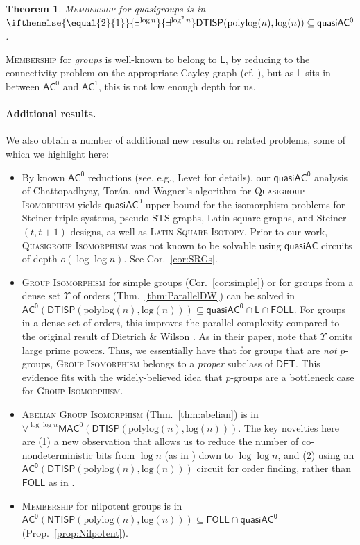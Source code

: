 \documentclass{article}
\newtheorem{theorem}{Theorem}\newtheorem{lemma}[theorem]{Lemma}\newtheorem{proposition}[theorem]{Proposition}\newtheorem{corollary}[theorem]{Corollary}\newtheorem{definition}[theorem]{Definition}\newtheorem{claim}[theorem]{Claim}\newtheorem{remark}[theorem]{Remark}\newtheorem{observation}[theorem]{Observation}\newtheorem{conjecture}[theorem]{Conjecture}\newtheorem{example}[theorem]{Example}
\newcommand{\algprobm}[1]{\textsc{#1}\xspace}
\newcommand{\betacc}[1]{\ifthenelse{\equal{#1}{1}}{\exists^{\log n}}{\exists^{\log^{#1}n}}} %
\newcommand*{\ComplexityClass}[1]{\ensuremath{\mathsf{#1}}\xspace}
\newcommand{\NTISP}{\ComplexityClass{NTISP}}
\newcommand{\DTISP}{\ComplexityClass{DTISP}}
\newcommand{\NTISPpll}{\ensuremath{\NTISP(\mathrm{polylog}(n),\mathrm{log}(n))}\xspace}
\newcommand{\DTISPpll}{\ensuremath{\DTISP(\mathrm{polylog}(n),\mathrm{log}(n))}\xspace}
\newcommand*{\LogSpace}{\ComplexityClass{L}}
\newcommand{\AC}{\ComplexityClass{AC}}
\newcommand{\ACz}{\ComplexityClass{AC^0}}
\newcommand{\qACz}{\ComplexityClass{quasiAC^0}}
\newcommand{\FOLL}{\ComplexityClass{FOLL}}
\begin{document}
\begin{theorem} \label{thm:main-cqm}
\algprobm{Membership} for quasigroups is in $\betacc{2}\DTISPpll \subseteq \qACz$.
\end{theorem}

 \algprobm{Membership} for \emph{groups} is well-known to belong to $\LogSpace$, by reducing to the connectivity problem on the appropriate Cayley graph (cf. \cite{BarringtonMcKenzie, Reingold}), but as $\LogSpace$ sits in between $\ACz$ and $\AC^1$, this is not low enough depth for us.

\paragraph{Additional results.} We also obtain a number of additional new results on related problems, some of which we highlight here:
\begin{itemize}
\item 
By known $\ACz$ reductions (see, e.g., Levet \cite{LevetLatinSquares} for details), our $\qACz$ analysis of Chattopadhyay, Torán, and Wagner's algorithm for \algprobm{Quasigroup Isomorphism} yields $\qACz$ upper bound for the isomorphism problems for Steiner triple systems, pseudo-STS graphs, Latin square graphs, and Steiner $(t,t+1)$-designs, as well as \algprobm{Latin Square Isotopy}. Prior to our work, \algprobm{Quasigroup Isomorphism} was not known to be solvable using $\mathsf{quasiAC}$ circuits of depth $o(\log \log n)$. See Cor.~\ref{cor:SRGs}.

\item \algprobm{Group Isomorphism} for simple groups (Cor.~\ref{cor:simple}) or for groups from a dense set $\Upsilon$ of orders (Thm.~\ref{thm:ParallelDW}) can be solved in $\ACz(\DTISPpll) \subseteq \qACz \cap \LogSpace \cap \FOLL$. For groups in a dense set of orders, this improves the parallel complexity compared to the original result of Dietrich \& Wilson \cite{DietrichWilson}. As in their paper, note that $\Upsilon$ omits large prime powers. Thus, we essentially have that for groups that are \textit{not} $p$-groups, \algprobm{Group Isomorphism} belongs to a \textit{proper} subclass of $\mathsf{DET}$. This evidence fits with the widely-believed idea that $p$-groups are a bottleneck case for \algprobm{Group Isomorphism}.

\item \algprobm{Abelian Group Isomorphism} (Thm.~\ref{thm:abelian}) is in $\forall^{\log \log n} \mathsf{MAC}^0(\DTISPpll)$. The key novelties here are (1) a new observation that allows us to reduce the number of co-nondeterministic bits from $\log n$ (as in \cite{GrochowLevetWL}) down to $\log \log n$, and (2) using an \\ $\ACz(\DTISPpll)$ circuit for order finding, rather than $\FOLL$ as in \cite{ChattopadhyayToranWagner}.

\item \algprobm{Membership} for nilpotent groups is in $\ACz(\NTISPpll) \subseteq \FOLL \cap\qACz$ (Prop.~\ref{prop:Nilpotent}).

\end{itemize}
\end{document}
